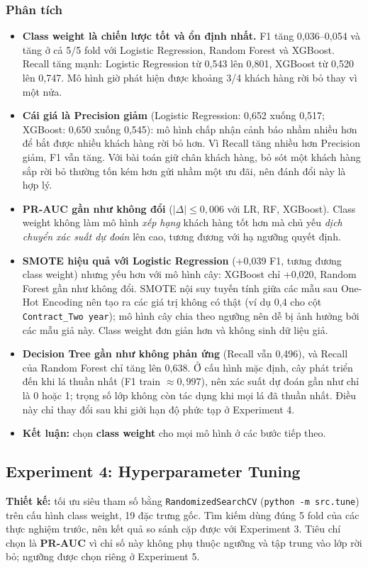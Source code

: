 \subsubsection{Phân tích}
\begin{itemize}
    \item \textbf{Class weight là chiến lược tốt và ổn định nhất.} F1 tăng 0,036--0,054 và tăng ở cả 5/5 fold với Logistic Regression, Random Forest và XGBoost. Recall tăng mạnh: Logistic Regression từ 0,543 lên 0,801, XGBoost từ 0,520 lên 0,747. Mô hình giờ phát hiện được khoảng 3/4 khách hàng rời bỏ thay vì một nửa.
    \item \textbf{Cái giá là Precision giảm} (Logistic Regression: 0,652 xuống 0,517; XGBoost: 0,650 xuống 0,545): mô hình chấp nhận cảnh báo nhầm nhiều hơn để bắt được nhiều khách hàng rời bỏ hơn. Vì Recall tăng nhiều hơn Precision giảm, F1 vẫn tăng. Với bài toán giữ chân khách hàng, bỏ sót một khách hàng sắp rời bỏ thường tốn kém hơn gửi nhầm một ưu đãi, nên đánh đổi này là hợp lý.
    \item \textbf{PR-AUC gần như không đổi} ($|\Delta| \le 0{,}006$ với LR, RF, XGBoost). Class weight không làm mô hình \textit{xếp hạng} khách hàng tốt hơn mà chủ yếu \textit{dịch chuyển xác suất dự đoán} lên cao, tương đương với hạ ngưỡng quyết định.
    \item \textbf{SMOTE hiệu quả với Logistic Regression} (+0,039 F1, tương đương class weight) nhưng yếu hơn với mô hình cây: XGBoost chỉ +0,020, Random Forest gần như không đổi. SMOTE nội suy tuyến tính giữa các mẫu sau One-Hot Encoding nên tạo ra các giá trị không có thật (ví dụ 0,4 cho cột \texttt{Contract\_Two year}); mô hình cây chia theo ngưỡng nên dễ bị ảnh hưởng bởi các mẫu giả này. Class weight đơn giản hơn và không sinh dữ liệu giả.
    \item \textbf{Decision Tree gần như không phản ứng} (Recall vẫn 0,496), và Recall của Random Forest chỉ tăng lên 0,638. Ở cấu hình mặc định, cây phát triển đến khi lá thuần nhất (F1 train $\approx 0{,}997$), nên xác suất dự đoán gần như chỉ là 0 hoặc 1; trọng số lớp không còn tác dụng khi mọi lá đã thuần nhất. Điều này chỉ thay đổi sau khi giới hạn độ phức tạp ở Experiment 4.
    \item \textbf{Kết luận:} chọn \textbf{class weight} cho mọi mô hình ở các bước tiếp theo.
\end{itemize}

\subsection{Experiment 4: Hyperparameter Tuning}
\textbf{Thiết kế:} tối ưu siêu tham số bằng \texttt{RandomizedSearchCV} (\texttt{python -m src.tune}) trên cấu hình class weight, 19 đặc trưng gốc. Tìm kiếm dùng đúng 5 fold của các thực nghiệm trước, nên kết quả so sánh cặp được với Experiment 3. Tiêu chí chọn là \textbf{PR-AUC} vì chỉ số này không phụ thuộc ngưỡng và tập trung vào lớp rời bỏ; ngưỡng được chọn riêng ở Experiment 5.

